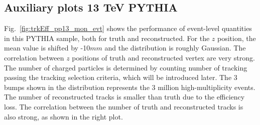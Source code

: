 \subsection{Auxiliary plots 13 TeV PYTHIA}
Fig.~\ref{fig:trkEff_pp13_mon_evt} shows the performance of event-level quantities in this PYTHIA sample, both for truth and reconstructed. For the $z$ position, the mean value is shifted by -10$mm$ and the distribution is roughly Gaussian. The correlation between $z$ positions of truth and reconstructed vertex are very strong. The number of charged particles is determined by counting number of tracking passing the tracking selection criteria, which will be introduced later. The 3 bumps shown in the distribution represents the 3 million high-multiplicity events. The number of reconstructed tracks is smaller than truth due to the efficiency loss. The correlation between the number of truth and reconstructed tracks is also strong, as shown in the right plot.

